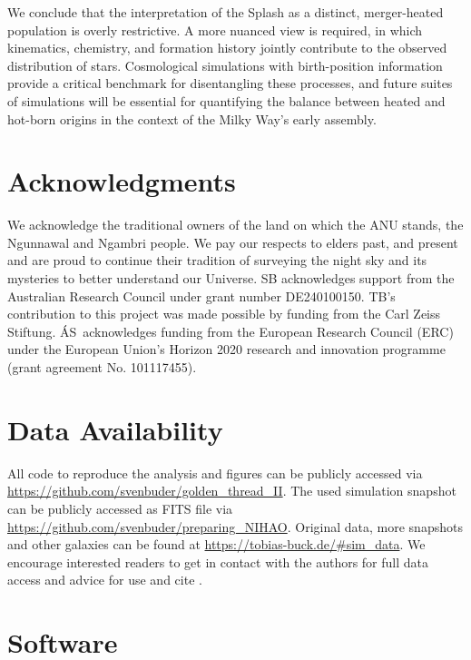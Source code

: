 \documentclass[fleqn,usenatbib]{mnras}
\begin{document}
We conclude that the interpretation of the Splash as a distinct, merger-heated population is overly restrictive. A more nuanced view is required, in which kinematics, chemistry, and formation history jointly contribute to the observed distribution of stars. Cosmological simulations with birth-position information provide a critical benchmark for disentangling these processes, and future suites of simulations will be essential for quantifying the balance between heated and hot-born origins in the context of the Milky Way’s early assembly.

\section*{Acknowledgments}

We acknowledge the traditional owners of the land on which the ANU stands, the Ngunnawal and Ngambri people. We pay our respects to elders past, and present and are proud to continue their tradition of surveying the night sky and its mysteries to better understand our Universe. SB acknowledges support from the Australian Research Council under grant number DE240100150.
TB's contribution to this project was made possible by funding from the Carl Zeiss Stiftung. \'{A}S~acknowledges funding from the European Research Council (ERC) under the European Union’s Horizon 2020 research and innovation programme (grant agreement No. 101117455).

\section*{Data Availability}

All code to reproduce the analysis and figures can be publicly accessed via \url{https://github.com/svenbuder/golden_thread_II}.
The used simulation snapshot can be publicly accessed as FITS file via \url{https://github.com/svenbuder/preparing_NIHAO}. Original data, more snapshots and other galaxies can be found at \url{https://tobias-buck.de/#sim_data}. We encourage interested readers to get in contact with the authors for full data access and advice for use and cite \citet{Buck2020b, Buck2021}.

\section*{Software}
\end{document}
